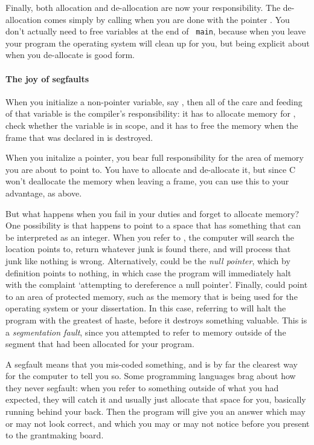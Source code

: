 \documentclass[12pt]{article}
\makeatletter
\def\ttindex#1{\index{#1@\cinline{#1}}}
\makeatother
\begin{document}
Finally, both allocation and de-allocation are now your
responsibility. The de-allocation comes simply by calling  \ttindex{free}
when you are done with the pointer . You don't actually need to free variables at the end of {\tt
main}, because when you leave your program the operating system will clean up for you, but being explicit
about when you de-allocate is good form.

\paragraph{The joy of segfaults}  
When you initialize a non-pointer variable, say , then all of
the care and feeding of that variable is the compiler's responsibility:
it has to allocate memory for , check whether the variable is
in scope, and it has to free the memory when the frame that 
was declared in is destroyed.

When you initalize a pointer, you bear full responsibility for the area
of memory you are about to point to. You have to allocate and de-allocate
it, but since C won't deallocate the memory when leaving a frame, you
can use this to your advantage, as above.

But what happens when you fail in your duties and forget to allocate
memory? One possibility is that  happens to point to a space
that has something that can be interpreted as an integer. When you refer
to , the computer will search the location 
points to, return whatever junk is found there, and will process that
junk like nothing is wrong. Alternatively,  could be the
{\sl null pointer},  which by definition points to nothing, in which
case the program will immediately halt with the complaint `attempting to
dereference a null pointer'. Finally,  could point to an area of
protected memory, such as the memory that is being used for the operating
system or your dissertation. In this case, referring to  will
halt the program with the greatest of haste, before it destroys something
valuable. This is a {\sl segmentation fault}, since you attempted to refer
to memory outside of the segment that had been allocated for your program.

A segfault means that you mis-coded something, and 
is by far the clearest way for the computer to tell you so. Some
programming languages
brag about how they never segfault: when you refer to something
outside of what you had expected, they will catch it and usually just
allocate that space for you, basically running  behind your
back. Then the program will give you an answer which may or may not look
correct, and which you may or may not notice before you present to the
grantmaking board. 
\end{document}

